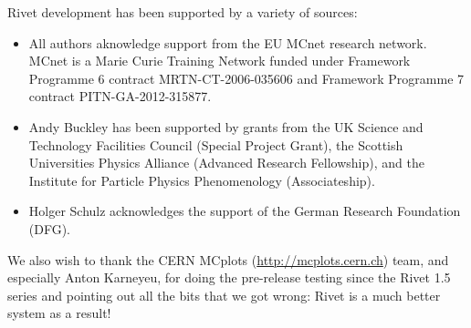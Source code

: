 Rivet development has been supported by a variety of sources:

\begin{itemize}
\item All authors aknowledge support from the EU MCnet research network. MCnet
  is a Marie Curie Training Network funded under Framework Programme 6
  contract MRTN-CT-2006-035606 and Framework Programme 7 contract PITN-GA-2012-315877.
\item Andy Buckley has been supported by grants from the UK Science and
  Technology Facilities Council (Special Project Grant), the Scottish
  Universities Physics Alliance (Advanced Research Fellowship), and the
  Institute for Particle Physics Phenomenology (Associateship).
\item Holger Schulz acknowledges the support of the German Research Foundation (DFG).
\end{itemize}

We also wish to thank the CERN MCplots (\url{http://mcplots.cern.ch}) team, and
especially Anton Karneyeu, for doing the pre-release testing since the Rivet 1.5
series and pointing out all the bits that we got wrong: Rivet is a much better
system as a result!
